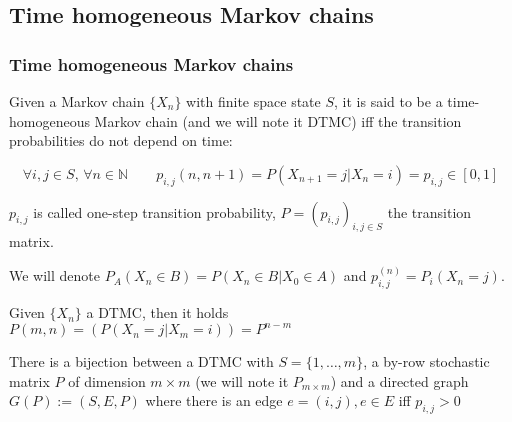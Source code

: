 \subsection{Time homogeneous Markov chains}
 \begin{frame} \frametitle{Time homogeneous Markov chains}
    \begin{definition}
    Given a Markov chain \(\{X_n\}\) with finite space state \(S\), it is said to be a 
    time-homogeneous Markov chain (and we will note it DTMC) iff the transition 
    probabilities do not depend on time:

    \[
    \forall i, j\in S, \,\forall n \in \mathbb{N} \qquad p_{i, j} (n, n + 1) = P(X_{n + 1} = j | X_{n} = i) = p_{i, j} \in [0, 1]
    \]

    \(p_{i, j}\) is called one-step transition probability, \(P = (p_{i, j})_{i, j \in S}\) the transition matrix.
    \end{definition}
    
    \begin{remark}
     We will denote $P_A(X_n \in B) = P(X_n \in B | X_{0} \in A)$ and $p_{i,j}^{(n)} = P_i(X_n = j)$.
    \end{remark}

    \begin{proposition}
    Given \(\{X_n\}\) a DTMC, then it holds \(P(m, n) = (P(X_{n} = j | X_{m} = i)) = P^{n - m}\)
    \end{proposition}
    
    \begin{remark}
    There is a bijection between a DTMC with $S = \{1, \ldots, m\}$,
    a by-row stochastic matrix $P$ of dimension $m \times m$ (we will note it 
    $P_{m\times m}$) and a directed graph $G(P):=(S, E, P)$ where there is an
    edge $e = (i, j), e \in E$ iff $p_{i,j} > 0$
    \end{remark}
 \end{frame}
